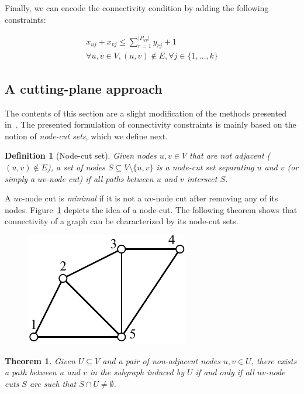 \documentclass[conference,compsoc]{IEEEtran}
\newtheorem{theorem}{Theorem}
\newtheorem{definition}{Definition}
\begin{document}
Finally, we can encode the connectivity condition by adding the following constraints:

\begin{multline}
x_{uj} + x_{vj} \leq \sum_{r=1}^{|P_{uv}|} y_{rj} + 1 \\
\forall u, v \in V, (u, v) \notin E, \forall j \in \{1, \ldots, k\}
\end{multline}

\subsection{A cutting-plane approach}
 The contents of this
section are a slight modification of the methods presented in~\cite{CarvajalCGVW13}. The presented formulation of connectivity constraints is mainly based on the notion of \emph{node-cut sets}, which we define next. 

\begin{definition}[Node-cut set]
Given nodes $u, v \in V$ that are not adjacent ($(u, v) \notin E$), a set of nodes $S \subseteq V \setminus \{u, v\}$ is a \emph{node-cut set} separating $u$ and $v$ (or simply a \emph{$uv$-node cut}) if all paths between $u$ and $v$ intersect $S$.
\end{definition}

A $uv$-node cut is \emph{minimal} if it is not a $uv$-node cut after removing any of its nodes. Figure~\ref{fig:cutset} depicts the idea of a node-cut. The following theorem shows that connectivity of a graph can be characterized by its node-cut sets. 

\begin{figure}
\centering
\includegraphics[scale=0.7]{images/cutset}
\captionsetup{font=small}
\label{fig:cutset}
\end{figure}

\begin{theorem}
Given $U \subseteq V$ and a pair of non-adjacent nodes $u, v \in U$, there exists a path between $u$ and $v$ in the subgraph induced by $U$ if and only if all $uv$-node cuts $S$ are such that $S \cap U \neq \emptyset$.
\end{theorem}
\end{document}
